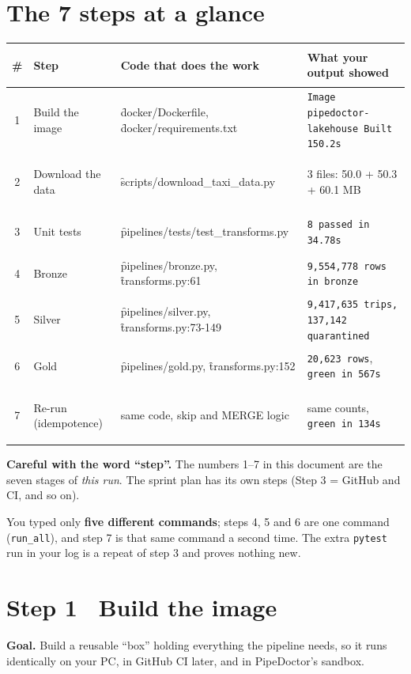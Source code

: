 \documentclass[11pt,a4paper]{article}
\let\oldsection\section
\renewcommand{\section}{\Needspace*{9\baselineskip}\oldsection}
\begin{document}
\section{The 7 steps at a glance}
\begin{tabularx}{\textwidth}{@{}c>{\bfseries\raggedright\arraybackslash}p{3.0cm}p{6.1cm}X@{}}
\toprule
\# & Step & Code that does the work & What your output showed \\
\midrule
1 & Build the image & \f{docker/Dockerfile}, \f{docker/requirements.txt} & \texttt{Image pipedoctor-lakehouse Built 150.2s} \\
2 & Download the data & \f{scripts/download_taxi_data.py} & 3 files: 50.0 + 50.3 + 60.1 MB \\
3 & Unit tests & \f{pipelines/tests/test_transforms.py} & \texttt{8 passed in 34.78s} \\
4 & Bronze & \f{pipelines/bronze.py}, \f{transforms.py:61} & \texttt{9,554,778 rows in bronze} \\
5 & Silver & \f{pipelines/silver.py}, \f{transforms.py:73-149} & \texttt{9,417,635 trips, 137,142 quarantined} \\
6 & Gold & \f{pipelines/gold.py}, \f{transforms.py:152} & \texttt{20,623 rows}, \texttt{green in 567s} \\
7 & Re-run (idempotence) & same code, skip and MERGE logic & same counts, \texttt{green in 134s} \\
\bottomrule
\end{tabularx}

\medskip
\textbf{Careful with the word ``step''.} The numbers 1--7 in this document are the seven stages of \emph{this run}. The sprint plan has its own steps (Step 3 = GitHub and CI, and so on).

You typed only \textbf{five different commands}; steps 4, 5 and 6 are one command (\texttt{run\_all}), and step 7 is that same command a second time. The extra \texttt{pytest} run in your log is a repeat of step 3 and proves nothing new.

\section{Step 1 \textemdash\ Build the image}
\begin{goal}\textbf{Goal.} Build a reusable ``box'' holding everything the pipeline needs, so it runs identically on your PC, in GitHub CI later, and in PipeDoctor's sandbox.\end{goal}
\end{document}
